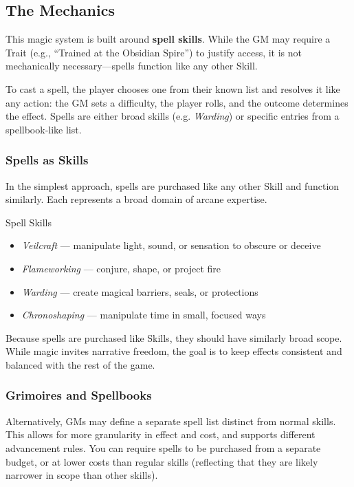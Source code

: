 \subsection{The Mechanics}

This magic system is built around \textbf{spell skills}. While the GM may require a Trait (e.g., “Trained at the Obsidian Spire”) to justify access, it is not mechanically necessary—spells function like any other Skill.

To cast a spell, the player chooses one from their known list and resolves it like any action: the GM sets a difficulty, the player rolls, and the outcome determines the effect. Spells are either broad skills (e.g. \textit{Warding}) or specific entries from a spellbook-like list.

\subsubsection{Spells as Skills}

In the simplest approach, spells are purchased like any other Skill and function similarly. Each represents a broad domain of arcane expertise.

\begin{Example}{Spell Skills}
    \begin{itemize}
        \item \textit{Veilcraft} — manipulate light, sound, or sensation to obscure or deceive  
        \item \textit{Flameworking} — conjure, shape, or project fire  
        \item \textit{Warding} — create magical barriers, seals, or protections  
        \item \textit{Chronoshaping} — manipulate time in small, focused ways  
    \end{itemize}
\end{Example}

Because spells are purchased like Skills, they should have similarly broad scope. While magic invites narrative freedom, the goal is to keep effects consistent and balanced with the rest of the game.

\subsubsection{Grimoires and Spellbooks}

Alternatively, GMs may define a separate spell list distinct from normal skills. This allows for more granularity in effect and cost, and supports different advancement rules. You can require spells to be purchased from a separate budget, or at lower costs than regular skills (reflecting that they are likely narrower in scope than other skills).

